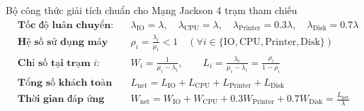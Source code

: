 \begin{modelbox}{Bộ công thức giải tích chuẩn cho Mạng Jackson 4 trạm tham chiếu}
\begin{align*}
    &\textbf{Tốc độ luân chuyển:} && \lambda_{\text{IO}} = \lambda, \quad \lambda_{\text{CPU}} = \lambda, \quad \lambda_{\text{Printer}} = 0.3\lambda, \quad \lambda_{\text{Disk}} = 0.7\lambda \\[4pt]
    &\textbf{Hệ số sử dụng máy chủ:} && \rho_i = \frac{\lambda_i}{\mu_i} < 1 \quad (\forall i \in \{\text{IO}, \text{CPU}, \text{Printer}, \text{Disk}\}) \\[4pt]
    &\textbf{Chỉ số tại trạm } i\textbf{:} && W_i = \frac{1}{\mu_i - \lambda_i}, \qquad L_i = \frac{\lambda_i}{\mu_i - \lambda_i} = \frac{\rho_i}{1 - \rho_i} \\[4pt]
    &\textbf{Tổng số khách toàn mạng:} && L_{\text{net}} = L_{\text{IO}} + L_{\text{CPU}} + L_{\text{Printer}} + L_{\text{Disk}} \\[4pt]
    &\textbf{Thời gian đáp ứng toàn trình:} && W_{\text{net}} = W_{\text{IO}} + W_{\text{CPU}} + 0.3 W_{\text{Printer}} + 0.7 W_{\text{Disk}} = \frac{L_{\text{net}}}{\lambda}
\end{align*}
\end{modelbox}